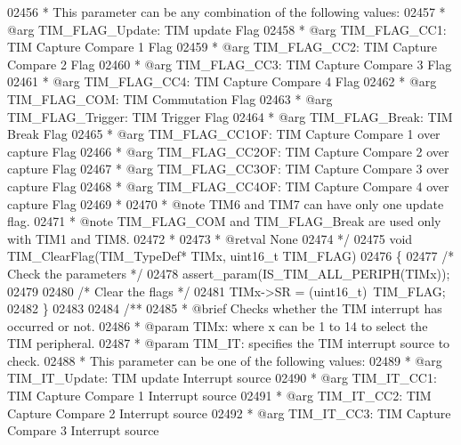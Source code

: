 \begin{DoxyCode}
02456 \textcolor{comment}{  *          This parameter can be any combination of the following values:}
02457 \textcolor{comment}{  *            @arg TIM\_FLAG\_Update: TIM update Flag}
02458 \textcolor{comment}{  *            @arg TIM\_FLAG\_CC1: TIM Capture Compare 1 Flag}
02459 \textcolor{comment}{  *            @arg TIM\_FLAG\_CC2: TIM Capture Compare 2 Flag}
02460 \textcolor{comment}{  *            @arg TIM\_FLAG\_CC3: TIM Capture Compare 3 Flag}
02461 \textcolor{comment}{  *            @arg TIM\_FLAG\_CC4: TIM Capture Compare 4 Flag}
02462 \textcolor{comment}{  *            @arg TIM\_FLAG\_COM: TIM Commutation Flag}
02463 \textcolor{comment}{  *            @arg TIM\_FLAG\_Trigger: TIM Trigger Flag}
02464 \textcolor{comment}{  *            @arg TIM\_FLAG\_Break: TIM Break Flag}
02465 \textcolor{comment}{  *            @arg TIM\_FLAG\_CC1OF: TIM Capture Compare 1 over capture Flag}
02466 \textcolor{comment}{  *            @arg TIM\_FLAG\_CC2OF: TIM Capture Compare 2 over capture Flag}
02467 \textcolor{comment}{  *            @arg TIM\_FLAG\_CC3OF: TIM Capture Compare 3 over capture Flag}
02468 \textcolor{comment}{  *            @arg TIM\_FLAG\_CC4OF: TIM Capture Compare 4 over capture Flag}
02469 \textcolor{comment}{  *}
02470 \textcolor{comment}{  * @note   TIM6 and TIM7 can have only one update flag. }
02471 \textcolor{comment}{  * @note   TIM\_FLAG\_COM and TIM\_FLAG\_Break are used only with TIM1 and TIM8.}
02472 \textcolor{comment}{  *    }
02473 \textcolor{comment}{  * @retval None}
02474 \textcolor{comment}{  */}
02475 \textcolor{keywordtype}{void} TIM_ClearFlag(TIM\_TypeDef* TIMx, uint16\_t TIM\_FLAG)
02476 \{
02477   \textcolor{comment}{/* Check the parameters */}
02478   assert_param(IS\_TIM\_ALL\_PERIPH(TIMx));
02479 
02480   \textcolor{comment}{/* Clear the flags */}
02481   TIMx->SR = (uint16\_t)~TIM\_FLAG;
02482 \}
02483 
02484 \textcolor{comment}{/**}
02485 \textcolor{comment}{  * @brief  Checks whether the TIM interrupt has occurred or not.}
02486 \textcolor{comment}{  * @param  TIMx: where x can be 1 to 14 to select the TIM peripheral.}
02487 \textcolor{comment}{  * @param  TIM\_IT: specifies the TIM interrupt source to check.}
02488 \textcolor{comment}{  *          This parameter can be one of the following values:}
02489 \textcolor{comment}{  *            @arg TIM\_IT\_Update: TIM update Interrupt source}
02490 \textcolor{comment}{  *            @arg TIM\_IT\_CC1: TIM Capture Compare 1 Interrupt source}
02491 \textcolor{comment}{  *            @arg TIM\_IT\_CC2: TIM Capture Compare 2 Interrupt source}
02492 \textcolor{comment}{  *            @arg TIM\_IT\_CC3: TIM Capture Compare 3 Interrupt source}

\end{DoxyCode}

